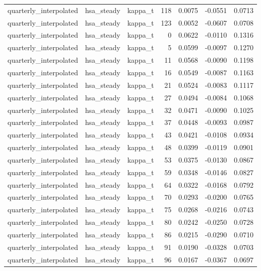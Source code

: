 \begin{tabular}{lllrrrr}
quarterly\_interpolated & hsa\_steady & kappa\_t & 118 & 0.0075 & -0.0551 & 0.0713 \\
quarterly\_interpolated & hsa\_steady & kappa\_t & 123 & 0.0052 & -0.0607 & 0.0708 \\
quarterly\_interpolated & hsa\_steady & kappa\_t & 0 & 0.0622 & -0.0110 & 0.1316 \\
quarterly\_interpolated & hsa\_steady & kappa\_t & 5 & 0.0599 & -0.0097 & 0.1270 \\
quarterly\_interpolated & hsa\_steady & kappa\_t & 11 & 0.0568 & -0.0090 & 0.1198 \\
quarterly\_interpolated & hsa\_steady & kappa\_t & 16 & 0.0549 & -0.0087 & 0.1163 \\
quarterly\_interpolated & hsa\_steady & kappa\_t & 21 & 0.0524 & -0.0083 & 0.1117 \\
quarterly\_interpolated & hsa\_steady & kappa\_t & 27 & 0.0494 & -0.0084 & 0.1068 \\
quarterly\_interpolated & hsa\_steady & kappa\_t & 32 & 0.0471 & -0.0090 & 0.1025 \\
quarterly\_interpolated & hsa\_steady & kappa\_t & 37 & 0.0448 & -0.0093 & 0.0987 \\
quarterly\_interpolated & hsa\_steady & kappa\_t & 43 & 0.0421 & -0.0108 & 0.0934 \\
quarterly\_interpolated & hsa\_steady & kappa\_t & 48 & 0.0399 & -0.0119 & 0.0901 \\
quarterly\_interpolated & hsa\_steady & kappa\_t & 53 & 0.0375 & -0.0130 & 0.0867 \\
quarterly\_interpolated & hsa\_steady & kappa\_t & 59 & 0.0348 & -0.0146 & 0.0827 \\
quarterly\_interpolated & hsa\_steady & kappa\_t & 64 & 0.0322 & -0.0168 & 0.0792 \\
quarterly\_interpolated & hsa\_steady & kappa\_t & 70 & 0.0293 & -0.0200 & 0.0765 \\
quarterly\_interpolated & hsa\_steady & kappa\_t & 75 & 0.0268 & -0.0216 & 0.0743 \\
quarterly\_interpolated & hsa\_steady & kappa\_t & 80 & 0.0242 & -0.0250 & 0.0728 \\
quarterly\_interpolated & hsa\_steady & kappa\_t & 86 & 0.0215 & -0.0290 & 0.0710 \\
quarterly\_interpolated & hsa\_steady & kappa\_t & 91 & 0.0190 & -0.0328 & 0.0703 \\
quarterly\_interpolated & hsa\_steady & kappa\_t & 96 & 0.0167 & -0.0367 & 0.0697 \\

\end{tabular}
